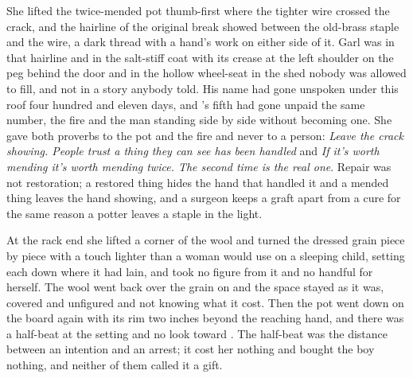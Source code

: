 She lifted the twice-mended pot thumb-first where the tighter wire crossed the crack, and the hairline of the original break showed between the old-brass staple and the wire, a dark thread with a hand's work on either side of it. Garl was in that hairline and in the salt-stiff coat with its crease at the left shoulder on the peg behind the door and in the hollow wheel-seat in the shed nobody was allowed to fill, and not in a story anybody told. His name had gone unspoken under this roof four hundred and eleven days, and 's fifth had gone unpaid the same number, the fire and the man standing side by side without becoming one. She gave both proverbs to the pot and the fire and never to a person: \emph{Leave the crack showing. People trust a thing they can see has been handled} and \emph{If it's worth mending it's worth mending twice. The second time is the real one}. Repair was not restoration; a restored thing hides the hand that handled it and a mended thing leaves the hand showing, and a surgeon keeps a graft apart from a cure for the same reason a potter leaves a staple in the light.

At the rack end she lifted a corner of the wool and turned the dressed grain piece by piece with a touch lighter than a woman would use on a sleeping child, setting each down where it had lain, and took no figure from it and no handful for herself. The wool went back over the grain on  and the space stayed as it was, covered and unfigured and not knowing what it cost. Then the pot went down on the board again with its rim two inches beyond the reaching hand, and there was a half-beat at the setting and no look toward . The half-beat was the distance between an intention and an arrest; it cost her nothing and bought the boy nothing, and neither of them called it a gift.

